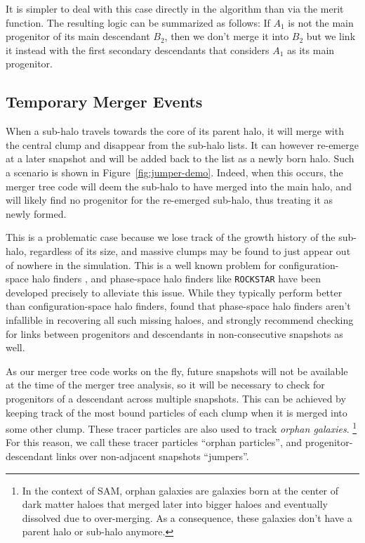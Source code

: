 It is simpler to deal with this case directly in the algorithm
than via the merit function. The resulting logic can be summarized as
follows: If $A_1$ is not the main progenitor of its main descendant
$B_2$, then we don't merge it into $B_2$ but we link it instead with
the first secondary descendants that considers $A_1$ as its
main progenitor.


\subsection{Temporary Merger Events}
\label{sect:jumpers}



When a sub-halo travels towards the core of its parent halo, it will
merge with the central clump and disappear from the sub-halo lists.  It
can however re-emerge at a later snapshot and will be added back
to the list as a newly born halo. Such a scenario is shown in
Figure~\ref{fig:jumper-demo}.  Indeed, when this occurs, the merger
tree code will deem the sub-halo to have merged into the main halo, and
will likely find no progenitor for the re-emerged sub-halo, thus
treating it as newly formed.

This is a problematic case because we lose track of the growth history
of the sub-halo, regardless of its size, and massive clumps may be
found to just appear out of nowhere in the simulation.  This is a well
known problem for configuration-space halo finders
\citep{onionsSubhaloesGoingNotts2012}, and phase-space halo finders
like \texttt{ROCKSTAR} \citep{behrooziRockstarPhaseSpaceTemporal2013}
have been developed precisely to alleviate this issue.  While they
typically perform better than configuration-space halo finders,
\cite{SUSSING_COMPARISON} found that phase-space halo finders aren't
infallible in recovering all such missing haloes, and strongly
recommend checking for links between progenitors and descendants in
non-consecutive snapshots as well.

As our merger tree code works on the fly, future snapshots will not be
available at the time of the merger tree analysis, so it will be
necessary to check for progenitors of a descendant across multiple
snapshots.  This can be achieved by keeping track of the most bound
particles of each clump when it is merged into some other clump.
These tracer particles are also used to track {\it orphan galaxies}.
\footnote{In the context of SAM, orphan galaxies are galaxies born at
the center of dark matter haloes that merged later into bigger haloes
and eventually dissolved due to over-merging. As a consequence, these
galaxies don't have a parent halo or sub-halo anymore.}  For this
reason, we call these tracer particles ``orphan particles'', and
progenitor-descendant links over non-adjacent snapshots ``jumpers''.

